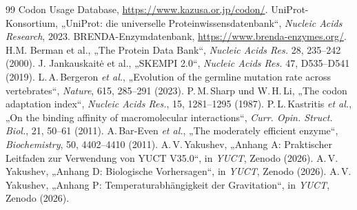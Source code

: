 \documentclass[12pt,a4paper]{article}
\begin{document}
	\begin{thebibliography}{99}
		 Codon Usage Database, \url{https://www.kazusa.or.jp/codon/}.
		 UniProt-Konsortium, „UniProt: die universelle Proteinwissensdatenbank“, \emph{Nucleic Acids Research}, 2023.
		 BRENDA-Enzymdatenbank, \url{https://www.brenda-enzymes.org/}.
		 H.M. Berman et al., „The Protein Data Bank“, \emph{Nucleic Acids Res.} 28, 235–242 (2000).
		 J. Jankauskaitė et al., „SKEMPI 2.0“, \emph{Nucleic Acids Res.} 47, D535–D541 (2019).
		 L.\,A.\,Bergeron \emph{et al.}, „Evolution of the germline mutation rate across vertebrates“, \emph{Nature}, 615, 285–291 (2023).
		 P.\,M.\,Sharp und W.\,H.\,Li, „The codon adaptation index“, \emph{Nucleic Acids Res.}, 15, 1281–1295 (1987).
		 P.\,L.\,Kastritis \emph{et al.}, „On the binding affinity of macromolecular interactions“, \emph{Curr. Opin. Struct. Biol.}, 21, 50–61 (2011).
		 A.\,Bar‑Even \emph{et al.}, „The moderately efficient enzyme“, \emph{Biochemistry}, 50, 4402–4410 (2011).
		 A.\,V.\,Yakushev, „Anhang A: Praktischer Leitfaden zur Verwendung von YUCT V35.0“, in \emph{YUCT}, Zenodo (2026).
		 A.\,V.\,Yakushev, „Anhang D: Biologische Vorhersagen“, in \emph{YUCT}, Zenodo (2026).
		 A.\,V.\,Yakushev, „Anhang P: Temperaturabhängigkeit der Gravitation“, in \emph{YUCT}, Zenodo (2026).
	\end{thebibliography}
	
\end{document}
